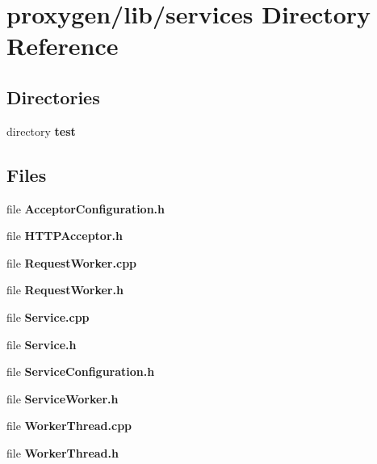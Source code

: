 \section{proxygen/lib/services Directory Reference}
\label{dir_dffc7fd270ecf9a30c90888e8e5b4514}
\subsection*{Directories}
\begin{DoxyCompactItemize}
\item 
directory {\bf test}
\end{DoxyCompactItemize}
\subsection*{Files}
\begin{DoxyCompactItemize}
\item 
file {\bf Acceptor\+Configuration.\+h}
\item 
file {\bf H\+T\+T\+P\+Acceptor.\+h}
\item 
file {\bf Request\+Worker.\+cpp}
\item 
file {\bf Request\+Worker.\+h}
\item 
file {\bf Service.\+cpp}
\item 
file {\bf Service.\+h}
\item 
file {\bf Service\+Configuration.\+h}
\item 
file {\bf Service\+Worker.\+h}
\item 
file {\bf Worker\+Thread.\+cpp}
\item 
file {\bf Worker\+Thread.\+h}
\end{DoxyCompactItemize}
